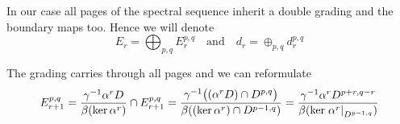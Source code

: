 \begin{definition}
	In our case all pages of the spectral sequence inherit a double grading and the boundary maps too. Hence we will denote
	\begin{equation*}
		E_r=\bigoplus_{p,q}E_r^{p,q}\quad \text{and} \quad d_r=\oplus_{p,q}d_r^{p,q}
	\end{equation*}
\end{definition}



\begin{corollary}\label{cor: explicit pages of exact sequences arising from exact couples with grading}
	The grading carries through all pages and we can reformulate
	\begin{equation*}
		E^{p,q}_{r+1}=\frac{\gamma^{-1}\alpha^rD}{\beta(\ker \alpha^r)}\cap E^{p,q}_{r+1}
		=\frac{\gamma^{-1}\big((\alpha^rD)\cap D^{p,q}\big)}{\beta((\ker \alpha^r)\cap D^{p-1,q})}
		=\frac{\gamma^{-1}\alpha^rD^{p+r,q-r}}{\beta(\ker \left.\alpha^r\right|_{D^{p-1,q}})}
	\end{equation*}
\end{corollary}


